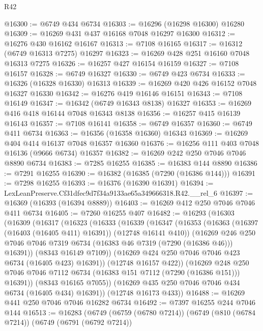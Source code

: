 \begin{lexlean}{R42}
\begin{coremodule}
{@16300 := @6749 @434 @6734
@16303 := @16296 (@16298 @16300) @16280
@16309 := @16269 @431 @437 @16168 @7048 @16297 @16300
@16312 := @16276 @430 @16162 @16167
@16313 := @7108 @16165
@16317 := @16312 (@6749 @16313 @7275) @16297
@16323 := @16269 @428 @251 @16160 @7048 @16313 @7275
@16326 := @16257 @427 @16154 @16159
@16327 := @7108 @16157
@16328 := @6749 @16327
@16330 := @6749 @423 @6734
@16333 := @16326 (@16328 @16330) @16313
@16339 := @16269 @420 @426 @16152 @7048 @16327 @16330
@16342 := @16276 @419 @16146 @16151
@16343 := @7108 @16149
@16347 := @16342 (@6749 @16343 @8138) @16327
@16353 := @16269 @416 @418 @16144 @7048 @16343 @8138
@16356 := @16257 @415 @16139 @16143
@16357 := @7108 @16141
@16358 := @6749 @16357
@16360 := @6749 @411 @6734
@16363 := @16356 (@16358 @16360) @16343
@16369 := @16269 @404 @414 @16137 @7048 @16357 @16360
@16376 := @16256 @111 @403 @7048 @16136 (@9666 @6734) @16357
@16382 := @16269 @242 @250 @7046 @7046 @8890 @6734
@16383 := @7285 @16255
@16385 := @16383 @144 @8890
@16386 := @7291 @16255
@16390 := @16382 (@16385 (@7290 (@16386 @144)))
@16391 := @7298 @16255
@16393 := @16376 (@16390 @16391)
@16394 := LexLeanPreserve.Cf31dfec9d7f34a9133ae65a349666318.R42.__rel_6
@16397 := @16369 (@16393 (@16394 @8889))
@16403 := @16269 @412 @250 @7046 @7046 @411 @6734
@16405 := @7260 @16255 @407
@16482 := @16293
    (@16303
      (@16309
        (@16317
          (@16323
            (@16333
              (@16339
                (@16347
                  (@16353
                    (@16363 (@16397 (@16403 (@16405 @411) @16391)) (@12748 @16141 @410))
                    (@16269
                      @246
                      @250
                      @7046
                      @7046
                      @7319
                      @6734
                      (@16383 @46 @7319 (@7290 (@16386 @46)))
                      @16391))
                  (@8343 @16149 @7109))
                (@16269 @424 @250 @7046 @7046 @423 @6734 (@16405 @423) @16391))
              (@12748 @16157 @422))
            (@16269
              @248
              @250
              @7046
              @7046
              @7112
              @6734
              (@16383 @151 @7112 (@7290 (@16386 @151)))
              @16391))
          (@8343 @16165 @7055))
        (@16269 @435 @250 @7046 @7046 @434 @6734 (@16405 @434) @16391))
      (@12748 @16173 @433))
@16488 := @16269 @441 @250 @7046 @7046 @16282 @6734
@16492 := @7397 @16255 @244 @7046 @144
@16513 := @16283
    (@6749
      (@6759 (@6780 @7214))
      (@6749
        (@810 (@6784 @7214))
        (@6749
          (@6791 (@6792 @7214))
}
\end{coremodule}
\end{lexlean}
